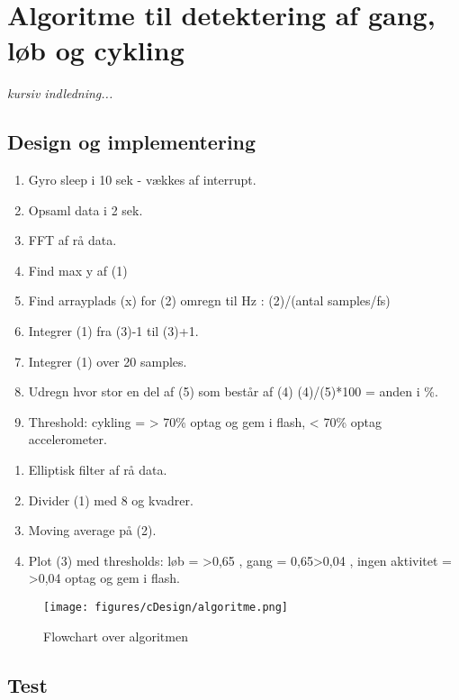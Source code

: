 \section{Algoritme til detektering af gang, løb og cykling}
\textit{kursiv indledning...}

\subsection{Design og implementering}


\begin{enumerate}
	\item Gyro sleep i 10 sek - vækkes af interrupt.
	\item Opsaml data i 2 sek.
	\item FFT af rå data.
	\item Find max y af (1)
	\item Find arrayplads (x) for (2) \textrightarrow omregn til Hz : (2)/(antal samples/fs)
	\item Integrer (1) fra (3)-1 til (3)+1.
	\item Integrer (1) over 20 samples.
	\item Udregn hvor stor en del af (5) som består af (4) \textrightarrow (4)/(5)*100 = anden i \%.
	\item Threshold: cykling = > 70\% \textrightarrow optag og gem i flash, < 70\% \textrightarrow optag accelerometer. 
\end{enumerate}




\begin{enumerate}
	\item Elliptisk filter af rå data.
	\item Divider (1) med 8 og kvadrer.
	\item Moving average på (2). 
	\item Plot (3) med thresholds: løb = >0,65 , gang = 0,65>0,04 , ingen aktivitet = >0,04 \textrightarrow optag og gem i flash.
\end{enumerate}







\begin{figure}[H]
	\centering
	\texttt{[image: figures/cDesign/algoritme.png]}
	\caption{Flowchart over algoritmen}
	\label{fig:algoritme}
\end{figure}




\subsection{Test}


